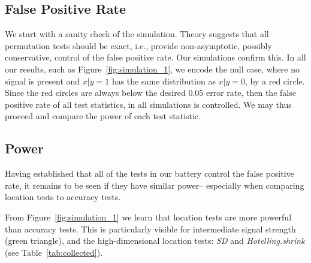 \documentclass[12pt,a4paper]{article}
\begin{document}
\subsection{False Positive Rate}
\label{sec:type_i}

We start with a sanity check of the simulation. 
Theory suggests that all permutation tests should be exact, i.e., provide non-asymptotic, possibly conservative, control of the false positive rate. 
Our simulations confirm this.
In all our results, such as Figure~\ref{fig:simulation_1}, we encode the null case, where no signal is present and $x|y=1$ has the same distribution as $x|y=0$, by a red circle. 
Since the red circles are always below the desired $0.05$ error rate, then the false positive rate of all test statistics, in all simulations is controlled. 
We may thus proceed and compare the power of each test statistic. 






\subsection{Power}
\label{sec:power}

Having established that all of the tests in our battery control the false positive rate, it remains to be seen if they have similar power-- especially when comparing location tests to accuracy tests. 

From Figure~\ref{fig:simulation_1} we learn that location tests are more powerful than accuracy tests.
This is particularly visible for intermediate signal strength (green triangle), and the high-dimensional location tests: \emph{SD} and \emph{Hotelling.shrink} (see Table~\ref{tab:collected}).
\end{document}
